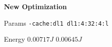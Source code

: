 
        \begin{tcolorbox}[width=\linewidth, colback=white!95!black, colframe=white!95!black]
            \begin{center}\textbf{New Optimization}\end{center}

            \tcblower
            
            Params \hfill \verb|-cache:dl1 dl1:4:32:4:l|

            Energy \hfill \st{$0.00717J$} $0.00645J$

        \end{tcolorbox}
    